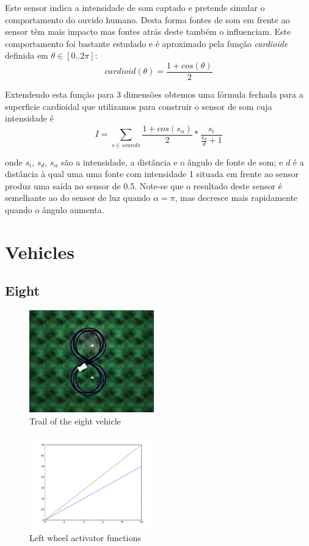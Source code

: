 \documentclass[a4paper]{article}
\begin{document}
\indent Este sensor indica a intensidade de som captado e pretende simular o
comportamento do ouvido humano. Desta forma fontes de som em frente ao sensor têm mais impacto
mas fontes atrás deste também o influenciam. Este comportamento foi bastante estudado e é aproximado pela função \emph{cardioide} definida em $\theta \in [0..2\pi]$:
\[
	cardioid(\theta) = \frac{1 + cos(\theta)}{2}
\]

\indent Extendendo esta função para 3 dimensões obtemos uma fórmula fechada para a superficie cardioidal
que utilizamos para construir o sensor de som cuja intensidade é
\[
	I = \displaystyle\sum\limits_{s \in sounds}\frac{1+cos(s_{\alpha})}{2}*\frac{s_{i}}{\frac{s_{d}}{d}+1}
\] 

onde $s_{i}$, $s_{d}$, $s_{\alpha}$ são a intensidade, a distância e o ângulo de fonte de som;
e $d$ é a distância à qual uma uma fonte com intensidade 1 situada em frente ao sensor produz uma saída no sensor de 0.5.
Note-se que o resultado deste sensor é semelhante ao do sensor de luz quando $\alpha=\pi$,
mas decresce mais rapidamente quando o ângulo aumenta.

\cleardoublepage
\section{Vehicles}
\subsection{Eight}
\begin{figure}
	\begin{center}
		\includegraphics[width=0.48\textwidth]{trail/eight.png}
	\end{center}
	\caption{Trail of the eight vehicle}
\end{figure}

\begin{figure}
	\begin{center}
		\includegraphics[width=0.48\textwidth]{graphs/activators/eight_l.png}
	\end{center}
	\caption{Left wheel activator functions}
\end{figure}
\end{document}
